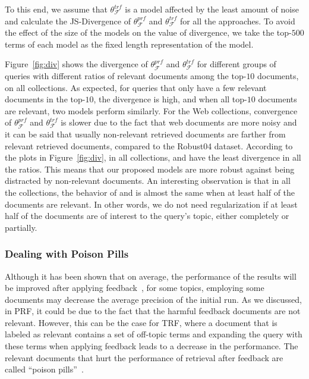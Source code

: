 To this end, we assume that $\theta_{\mathcal{F}}^{trf}$ is a model affected by the least amount of noise and calculate the JS-Divergence of $\theta_{\mathcal{F}}^{prf}$ and  $\theta_{\mathcal{F}}^{trf}$ for all the approaches.
To avoid the effect of the size of the models on the value of divergence, we take the top-$500$ terms of each model as the fixed length representation of the model. 

Figure~\ref{fig:div} shows the divergence of $\theta_{\mathcal{F}}^{prf}$ and  $\theta_{\mathcal{F}}^{trf}$ for different groups of queries with different ratios of relevant documents among the top-$10$ documents, on all collections. As expected, for queries that only have a few relevant documents in the top-$10$, the divergence is high, and when all top-$10$ documents are relevant, two models perform similarly. 
For the Web collections, convergence of $\theta_{\mathcal{F}}^{prf}$ and  $\theta_{\mathcal{F}}^{trf}$ is slower due to the fact that web documents are more noisy and it can be said that usually non-relevant retrieved documents are farther from relevant retrieved documents, compared to the Robust04 dataset. 
According to the plots in Figure~\ref{fig:div}, in all collections, \acswlm  and \acrswlm  have the least divergence in all the ratios. This means that our proposed models are more robust against being distracted by non-relevant documents. 
An interesting observation is that in all the collections, the behavior of \acswlm  and \acrswlm  is almost the same when at least half of the documents are relevant. In other words, we do not need regularization if at least half of the documents are of interest to the query's topic, either completely or partially.


\subsubsection{Dealing with Poison Pills}
\label{sec:pp}
Although it has been shown that on average, the performance of the results will be improved after applying feedback~\citep{Harman:2009,He:2009:ECIR}, for some topics, employing some documents may decrease the average precision of the initial run. 
As we discussed, in PRF, it could be due to the fact that the harmful feedback documents are not relevant. However, this can be the case for TRF, where a document that is labeled as relevant contains a set of off-topic terms and expanding the query with these terms when applying feedback leads to a decrease in the performance. The relevant documents that hurt the performance of retrieval after feedback are called ``poison pills''~\citep{Harman:2009,Warren:2004,Terra:2005,Dehghani:CIKM2016:short}.

